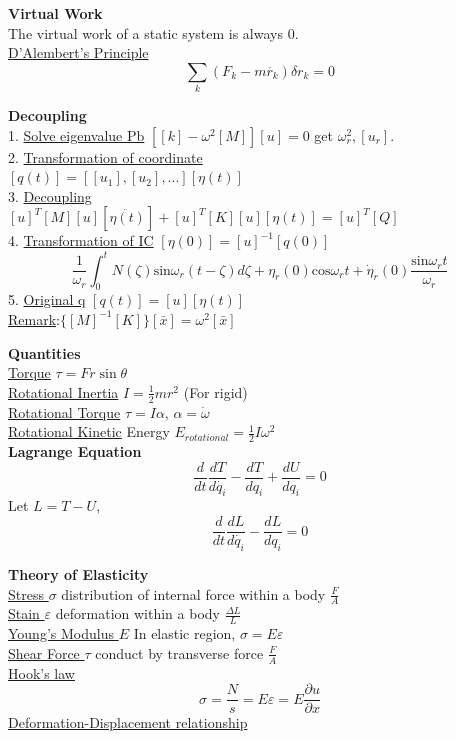 \documentclass{article}
\begin{document}
\begin{multicols*}{3}
\noindent\textbf{Virtual Work}\\
The virtual work of a static system is always 0.\\
\underline{D'Alembert's Principle}
\begin{equation*}
  \sum_k (F_k - m \ddot{r_k}) \delta r_k = 0
\end{equation*}

\noindent\textbf{Decoupling}\\
1. \underline{Solve eigenvalue Pb}
$[[k]-\omega^{2}[M]][u]=0$
get $\omega_{r}^{2},[u_{r}]$.\\
2. \underline{Transformation of coordinate}\\
$[q(t)]=[[u_{1}],[u_{2}],...][\eta(t)]$\\
3. \underline{Decoupling}\\
$[u]^{T}[M][u][\ddot{\eta(t)}]+[u]^{T}[K][u][\eta(t)]=[u]^{T}[Q]$\\
4. \underline{Transformation of IC} $[\eta(0)]=[u]^{-1}[q(0)]$
 $$
 \frac{1}{\omega_{r}}\int_{0}^{t}N(\zeta)\text{sin}\omega_{r}(t-\zeta)d\zeta+\eta_{r}(0)\text{cos}\omega_{r}t+\dot{\eta}_{r}(0)\frac{\text{sin}\omega_{r}t}{\omega_{r}}
 $$
5. \underline{Original q} $[q(t)]=[u][\eta(t)]$\\
\underline{Remark}:$\{[M]^{-1}[K]\}[\bar{x}]=\omega^{2}[\bar{x}]$

\noindent\textbf{Quantities}\\
\underline{Torque} $\tau = Fr \sin\theta$\\
\underline{Rotational Inertia} $I=\frac{1}{2}mr^2$ (For rigid)\\
\underline{Rotational Torque} $\tau = I\alpha$, $\alpha = \dot{\omega}$\\
\underline{Rotational Kinetic} Energy $E_{rotational}=\frac{1}{2}I\omega^2$\\

\noindent\textbf{Lagrange Equation}
\begin{equation*}
  \frac{d}{dt}\frac{dT}{d\dot{q_i}} - \frac{dT}{dq_i} + \frac{dU}{dq_i} = 0
\end{equation*}
Let $L = T - U$,
\begin{equation*}
  \frac{d}{dt}\frac{dL}{d\dot{q_i}} - \frac{dL}{dq_i} = 0
\end{equation*}

\noindent\textbf{Theory of Elasticity}\\
\underline{Stress $\sigma$} distribution of internal force within a body $\frac{F}{A}$\\
\underline{Stain $\varepsilon$} deformation within a body $\frac{\Delta L}{L}$\\
\underline{Young's Modulus $E$} In elastic region, $\sigma = E\varepsilon$\\
\underline{Shear Force $\tau$} conduct by transverse force $\frac{F}{A}$\\
\underline{Hook's law}
  \begin{equation*}
    \sigma=\frac{N}{s}=E\varepsilon=E\frac{\partial u}{\partial x}
  \end{equation*}
\underline{Deformation-Displacement relationship}


\end{multicols*}
\end{document}
